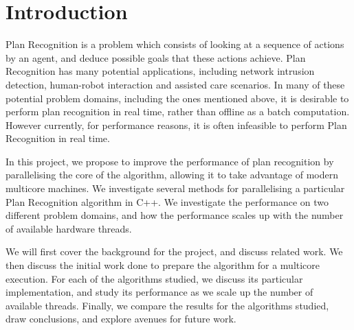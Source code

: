 \chapter{Introduction}

Plan Recognition is a problem which consists of looking at a sequence of actions by an agent, and deduce possible goals that these actions achieve. Plan Recognition has many potential applications, including network intrusion detection, human-robot interaction and assisted care scenarios. In many of these potential problem domains, including the ones mentioned above, it is desirable to perform plan recognition in real time, rather than offline as a batch computation. However currently, for performance reasons, it is often infeasible to perform Plan Recognition in real time.

In this project, we propose to improve the performance of plan recognition by parallelising the core of the algorithm, allowing it to take advantage of modern multicore machines. We investigate several methods for parallelising a particular Plan Recognition algorithm in C++. We investigate the performance on two different problem domains, and how the performance scales up with the number of available hardware threads.

We will first cover the background for the project, and discuss related work. We then discuss the initial work done to prepare the algorithm for a multicore execution. For each of the algorithms studied, we discuss its particular implementation, and study its performance as we scale up the number of available threads. Finally, we compare the results for the algorithms studied, draw conclusions, and explore avenues for future work.